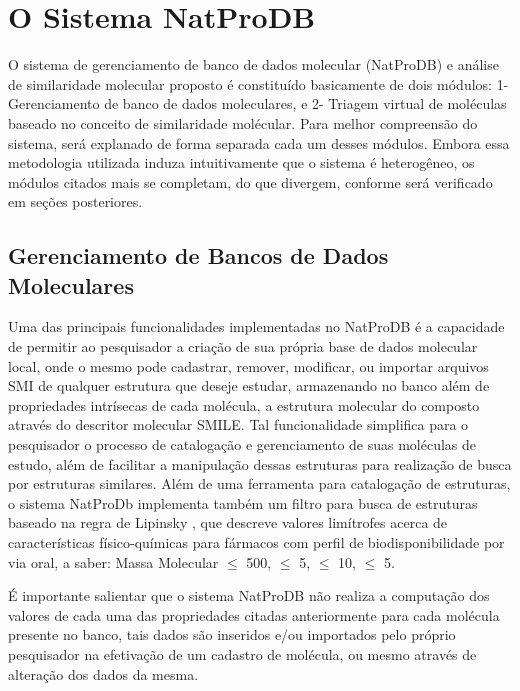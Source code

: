 \chapter{O Sistema NatProDB}
\label{chap:natprodb}

O sistema de gerenciamento de banco de dados molecular (NatProDB) e análise de similaridade molecular proposto é constituído basicamente de dois módulos: 1- Gerenciamento de banco de dados moleculares, e 2- Triagem virtual de moléculas baseado no conceito de similaridade molécular. Para melhor compreensão do sistema, será explanado de forma separada cada um desses módulos. Embora essa metodologia utilizada induza intuitivamente que o sistema é heterogêneo, os módulos citados mais se completam, do que divergem, conforme será verificado em seções posteriores.

\section{Gerenciamento de Bancos de Dados Moleculares}

Uma das principais funcionalidades implementadas no NatProDB é a capacidade de permitir ao pesquisador a criação de sua própria base de dados molecular local, onde o mesmo pode cadastrar, remover, modificar, ou importar arquivos SMI de qualquer estrutura que deseje estudar, armazenando no banco além de propriedades intrísecas de cada molécula, a estrutura molecular do composto através do descritor molecular SMILE. Tal funcionalidade simplifica para o pesquisador o processo de catalogação e gerenciamento de suas moléculas de estudo, além de facilitar a manipulação dessas estruturas para realização de busca por estruturas similares.   
Além de uma ferramenta para catalogação de estruturas, o sistema NatProDb implementa também um filtro para busca de estruturas baseado na regra de Lipinsky \cite{lipinski2012experimental}, que descreve valores limítrofes acerca de características físico-químicas para fármacos com perfil de biodisponibilidade por via oral, a saber: Massa Molecular $\leq$ 500,   $\leq$ 5,  $\leq$ 10,  $\leq$ 5.

É importante salientar que o sistema NatProDB não realiza a computação dos valores de cada uma das propriedades citadas anteriormente para cada molécula presente no banco, tais dados são inseridos e/ou importados pelo próprio pesquisador na efetivação de um cadastro de molécula, ou mesmo através de alteração dos dados da mesma.

